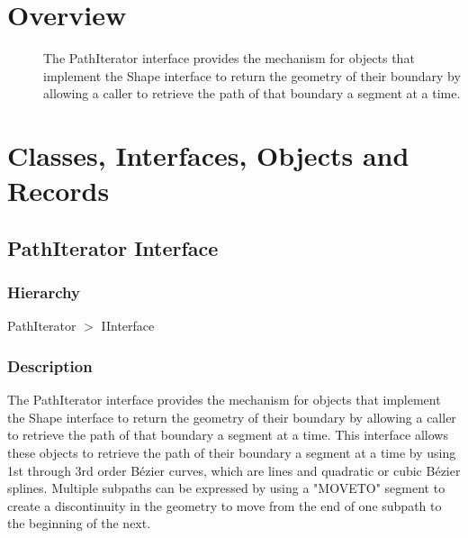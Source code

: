 \documentclass{report}
\newif\ifpdf
\begin{document}
\section{Overview}
\begin{description}
\item[\texttt{\begin{ttfamily}PathIterator\end{ttfamily} Interface}]The PathIterator interface provides the mechanism for objects that implement the Shape interface to return the geometry of their boundary by allowing a caller to retrieve the path of that boundary a segment at a time.
\item[\texttt{\begin{ttfamily}AffineTransform\end{ttfamily} Class}]
\end{description}
\section{Classes, Interfaces, Objects and Records}
\ifpdf
\subsection*{\large{\textbf{PathIterator Interface}}\normalsize\hspace{1ex}\hrulefill}
\else
\subsection*{PathIterator Interface}
\fi
\label{NewPascal.GUI.Geom.PathIterator}
\subsubsection*{\large{\textbf{Hierarchy}}\normalsize\hspace{1ex}\hfill}
PathIterator {$>$} IInterface
\subsubsection*{\large{\textbf{Description}}\normalsize\hspace{1ex}\hfill}
The PathIterator interface provides the mechanism for objects that implement the Shape interface to return the geometry of their boundary by allowing a caller to retrieve the path of that boundary a segment at a time. This interface allows these objects to retrieve the path of their boundary a segment at a time by using 1st through 3rd order Bézier curves, which are lines and quadratic or cubic Bézier splines. Multiple subpaths can be expressed by using a "MOVETO" segment to create a discontinuity in the geometry to move from the end of one subpath to the beginning of the next.
\end{document}
